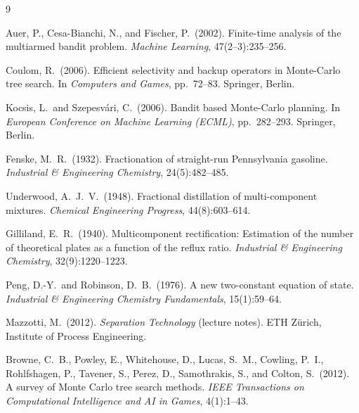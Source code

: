 \documentclass[11pt,a4paper]{article}
\theoremstyle{definition}
\theoremstyle{plain}
\begin{document}

\begin{thebibliography}{9}

Auer, P., Cesa-Bianchi, N., and Fischer, P.\ (2002).
Finite-time analysis of the multiarmed bandit problem.
\textit{Machine Learning}, 47(2--3):235--256.

Coulom, R.\ (2006).
Efficient selectivity and backup operators in Monte-Carlo tree search.
In \textit{Computers and Games}, pp.\ 72--83.
Springer, Berlin.

Kocsis, L.\ and Szepesv\'{a}ri, C.\ (2006).
Bandit based Monte-Carlo planning.
In \textit{European Conference on Machine Learning (ECML)},
pp.\ 282--293.
Springer, Berlin.

Fenske, M.~R.\ (1932).
Fractionation of straight-run Pennsylvania gasoline.
\textit{Industrial \& Engineering Chemistry}, 24(5):482--485.

Underwood, A.~J.~V.\ (1948).
Fractional distillation of multi-component mixtures.
\textit{Chemical Engineering Progress}, 44(8):603--614.

Gilliland, E.~R.\ (1940).
Multicomponent rectification: Estimation of the number of theoretical
plates as a function of the reflux ratio.
\textit{Industrial \& Engineering Chemistry}, 32(9):1220--1223.

Peng, D.-Y.\ and Robinson, D.~B.\ (1976).
A new two-constant equation of state.
\textit{Industrial \& Engineering Chemistry Fundamentals},
15(1):59--64.

Mazzotti, M.\ (2012).
\textit{Separation Technology} (lecture notes).
ETH Z\"{u}rich, Institute of Process Engineering.

Browne, C.~B., Powley, E., Whitehouse, D., Lucas, S.~M.,
 Cowling, P.~I., Rohlfshagen, P., Tavener, S., Perez, D.,
 Samothrakis, S., and Colton, S.\ (2012).
A survey of Monte Carlo tree search methods.
\textit{IEEE Transactions on Computational Intelligence and AI in Games},
4(1):1--43.

\end{thebibliography}
\end{document}
